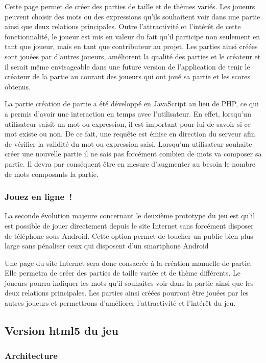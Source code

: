 \documentclass[a4paper,11pt,french]{article}
\def\android{Android\texttrademark{}}
\begin{document}
Cette page permet de créer des parties de taille et de thèmes variés. Les joueurs peuvent choisir des mots ou des expressions qu'ils souhaitent voir dans une partie ainsi que deux relations principales.
Outre l'attractivité et l'intérêt de cette fonctionnalité, le joueur est mis en valeur du fait qu'il participe non seulement en tant que joueur, mais en tant que contributeur au projet. Les parties ainsi créées sont jouées par d'autres joueurs, améliorent la qualité des parties et le créateur et il serait même envisageable dans une future version de l'application de tenir le créateur de la partie au courant des joueurs qui ont joué sa partie et les scores obtenus.

La partie création de partie a été développé en JavaScript au lieu de PHP, ce qui a permis d'avoir une interaction en temps avec l'utilisateur. En effet, lorsqu'un utilisateur saisit un mot ou expression, il est important pour lui de savoir si ce mot existe ou non. De ce fait, une requête est émise en direction du serveur afin de vérifier la validité du mot ou expression saisi. Lorsqu'un utilisateur souhaite créer une nouvelle partie 
il ne sais pas forcément combien de mots va composer sa partie. Il devra par conséquent être en mesure d'augmenter au besoin le nombre de mots composants la partie.

\subsubsection{Jouez en ligne~!}
La seconde évolution majeure concernant le deuxième prototype du jeu est qu'il est possible de jouer directement depuis
le site Internet sans forcément disposer de téléphone sous \android{}. Cette option permet de toucher un public bien plus large sans pénaliser ceux qui disposent d'un smartphone \android{}

Une page du site Internet sera donc consacrée
à la création manuelle de partie. Elle permetra de créer des parties de taille variée et de thème différents. Le joueurs pourra
indiquer les mots qu'il souhaites voir dans la partie ainsi que les deux relations principales.
Les parties ainsi créées pourront être jouées par les autres joueurs et permettrons d'améliorer l'attractivité et l'intérêt du jeu.


\subsection{Version html5 du jeu}
\label{sec:html5}
\subsubsection{Architecture}
\end{document}
